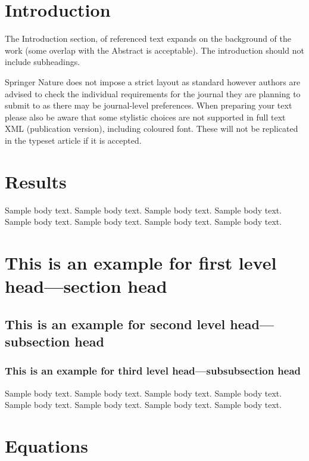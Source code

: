 \documentclass[pdflatex,sn-mathphys-num]{sn-jnl}%
\theoremstyle{thmstyleone}%
\theoremstyle{thmstyletwo}%
\theoremstyle{thmstylethree}%
\begin{document}
\section{Introduction}\label{sec1}

The Introduction section, of referenced text \cite{bib1} expands on the background of the work (some overlap with the Abstract is acceptable). The introduction should not include subheadings.

Springer Nature does not impose a strict layout as standard however authors are advised to check the individual requirements for the journal they are planning to submit to as there may be journal-level preferences. When preparing your text please also be aware that some stylistic choices are not supported in full text XML (publication version), including coloured font. These will not be replicated in the typeset article if it is accepted. 

\section{Results}\label{sec2}

Sample body text. Sample body text. Sample body text. Sample body text. Sample body text. Sample body text. Sample body text. Sample body text.

\section{This is an example for first level head---section head}\label{sec3}

\subsection{This is an example for second level head---subsection head}\label{subsec2}

\subsubsection{This is an example for third level head---subsubsection head}\label{subsubsec2}

Sample body text. Sample body text. Sample body text. Sample body text. Sample body text. Sample body text. Sample body text. Sample body text. 

\section{Equations}\label{sec4}
\end{document}
